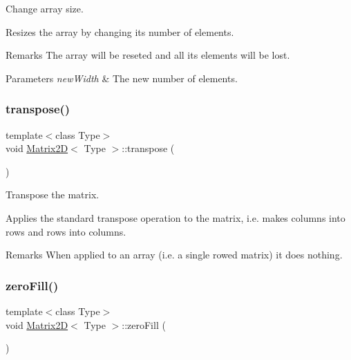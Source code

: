 Change array size. 

Resizes the array by changing its number of elements. \begin{DoxyRemark}{Remarks}
The array will be reseted and all its elements will be lost. 
\end{DoxyRemark}

\begin{DoxyParams}{Parameters}
{\em new\+Width} & The new number of elements. \\
\hline
\end{DoxyParams}
\mbox{\label{classMatrix2D_a788abe5e1fbd6a1fbd0d445aca4f8300}} 
\subsubsection{\texorpdfstring{transpose()}{transpose()}}
{\footnotesize\ttfamily template$<$class Type$>$ \\
void \mbox{\hyperlink{classMatrix2D}{Matrix2D}}$<$ Type $>$\+::transpose (\begin{DoxyParamCaption}{ }\end{DoxyParamCaption})\hspace{0.3cm}{\ttfamily [inline]}}



Transpose the matrix. 

Applies the standard transpose operation to the matrix, i.\+e. makes columns into rows and rows into columns. \begin{DoxyRemark}{Remarks}
When applied to an array (i.\+e. a single rowed matrix) it does nothing. 
\end{DoxyRemark}
\mbox{\label{classMatrix2D_a64929341625696e9500aa9b6d51a8ae6}} 
\subsubsection{\texorpdfstring{zero\+Fill()}{zeroFill()}}
{\footnotesize\ttfamily template$<$class Type$>$ \\
void \mbox{\hyperlink{classMatrix2D}{Matrix2D}}$<$ Type $>$\+::zero\+Fill (\begin{DoxyParamCaption}{ }\end{DoxyParamCaption})\hspace{0.3cm}{\ttfamily [inline]}}



